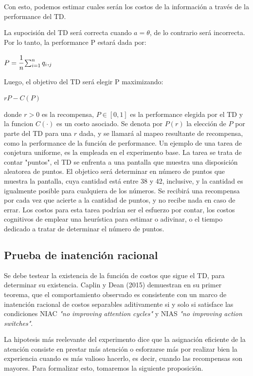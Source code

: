 \documentclass[11pt,letterpaper]{article}
\begin{document}
Con esto, podemos estimar cuales serán los costos de la información a través de la performance del TD.

La supocisión del TD será correcta cuando $a=\theta$, de lo contrario será incorrecta. Por lo tanto, la performance P estará dada por:
\begin{center}
    $P=\cfrac{1}{n}\sum_{i=1}^{n}q_i,_j$
\end{center}
Luego, el objetivo del TD será elegir P maximizando:
\begin{center}
$rP-C(P)$
\end{center}
donde $r>0$ es la recompensa, $P \in [0,1]$ es la performance elegida por el TD y la funcion $C (\cdot)$ es un costo asociado. Se denota por $P(r)$ la elección de $P$ por parte del TD para una $r$ dada, y se llamará al mapeo resultante de recompensa, como la performance de la función de performance.
Un ejemplo de una tarea de conjetura uniforme, es la empleada en el experimento base. La tarea se trata de contar "puntos", el TD se enfrenta a una pantalla que muestra una disposición aleatorea de puntos. El objetico será determinar en número de puntos que muestra la pantalla, cuya cantidad está entre 38 y 42, inclusive, y la cantidad es igualmente posible para cualquiera de los números. Se recibirá una recompensa por cada vez que acierte a la cantidad de puntos, y no recibe nada en caso de errar. Los costos para esta tarea podrían ser el esfuerzo por contar, los costos cognitivos de emplear una heurística para estimar o adivinar, o el tiempo dedicado a tratar de determinar el número de puntos.

\subsection{Prueba de inatención racional}

Se debe testear la existencia de la función de costos que sigue el TD, para determinar su existencia. Caplin y Dean (2015) demuestran en su primer teorema, que el comportamiento observado es consistente con un marco de inatención racional de costos separables aditivamente si y solo si satisface las condiciones NIAC \textit{"no improving attention cycles"} y NIAS \textit{"no improving action switches"}. 

La hipotesis más reelevante del experimento dice que la asignación eficiente de la atención consiste en prestar más atención o esforzarse más por realizar bien la experiencia cuando es más valioso hacerlo, es decir, cuando las recompensas son mayores. Para formalizar esto, tomaremos la siguiente proposición.
\end{document}
